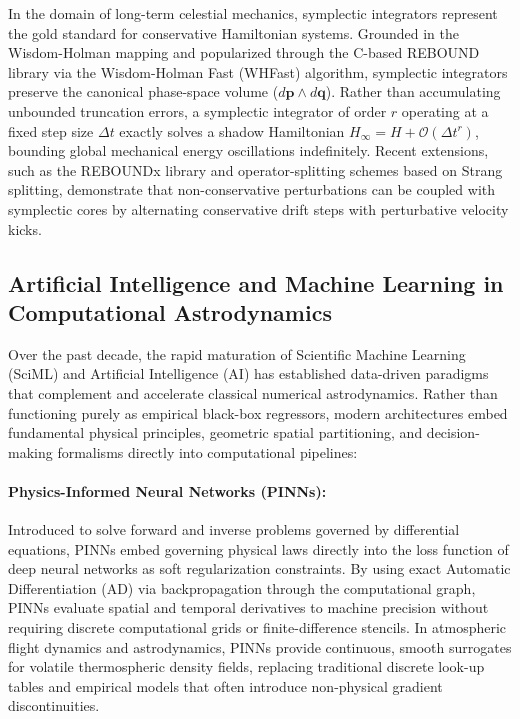 In the domain of long-term celestial mechanics, symplectic integrators represent the gold standard for conservative Hamiltonian systems. Grounded in the Wisdom-Holman mapping and popularized through the C-based REBOUND library via the Wisdom-Holman Fast (WHFast) algorithm, symplectic integrators preserve the canonical phase-space volume ($d\mathbf{p} \wedge d\mathbf{q}$). Rather than accumulating unbounded truncation errors, a symplectic integrator of order $r$ operating at a fixed step size $\Delta t$ exactly solves a shadow Hamiltonian $H_\infty = H + \mathcal{O}(\Delta t^r)$, bounding global mechanical energy oscillations indefinitely. Recent extensions, such as the REBOUNDx library and operator-splitting schemes based on Strang splitting, demonstrate that non-conservative perturbations can be coupled with symplectic cores by alternating conservative drift steps with perturbative velocity kicks.

\subsection{Artificial Intelligence and Machine Learning in Computational Astrodynamics}
\label{sec:sota_ai}

Over the past decade, the rapid maturation of Scientific Machine Learning (SciML) and Artificial Intelligence (AI) has established data-driven paradigms that complement and accelerate classical numerical astrodynamics. Rather than functioning purely as empirical black-box regressors, modern architectures embed fundamental physical principles, geometric spatial partitioning, and decision-making formalisms directly into computational pipelines:

\paragraph{Physics-Informed Neural Networks (PINNs):}
Introduced to solve forward and inverse problems governed by differential equations, PINNs embed governing physical laws directly into the loss function of deep neural networks as soft regularization constraints. By using exact Automatic Differentiation (AD) via backpropagation through the computational graph, PINNs evaluate spatial and temporal derivatives to machine precision without requiring discrete computational grids or finite-difference stencils. In atmospheric flight dynamics and astrodynamics, PINNs provide continuous, smooth surrogates for volatile thermospheric density fields, replacing traditional discrete look-up tables and empirical models that often introduce non-physical gradient discontinuities.

